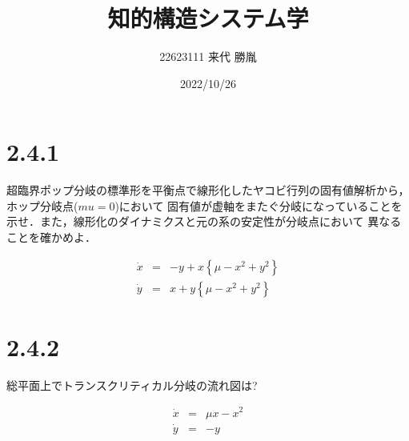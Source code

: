 \documentclass[a4paper]{jsarticle}
\author{22623111 来代 勝胤}
\title{知的構造システム学}
\date{2022/10/26}
\begin{document}
\maketitle
\section*{2.4.1}
超臨界ポップ分岐の標準形を平衡点で線形化したヤコビ行列の固有値解析から，ホップ分岐点($mu = 0$)において
固有値が虚軸をまたぐ分岐になっていることを示せ．また，線形化のダイナミクスと元の系の安定性が分岐点において
異なることを確かめよ．

\begin{eqnarray*}
	\dot{x}&=&-y+x\left\{\mu - x^2 + y^2\right\}\\
	\dot{y}&=&x+y\left\{\mu - x^2 + y^2\right\}
\end{eqnarray*}

\newpage

\section*{2.4.2}
総平面上でトランスクリティカル分岐の流れ図は?

\begin{eqnarray*}
	\dot{x} &=& \mu x - x^2\\
	\dot{y} &=& -y
\end{eqnarray*}
\end{document}
